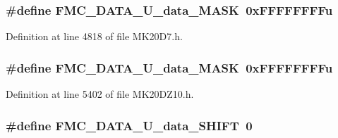 \subsubsection[{\texorpdfstring{F\+M\+C\+\_\+\+D\+A\+T\+A\+\_\+\+U\+\_\+data\+\_\+\+M\+A\+SK}{FMC_DATA_U_data_MASK}}]{\setlength{\rightskip}{0pt plus 5cm}\#define F\+M\+C\+\_\+\+D\+A\+T\+A\+\_\+\+U\+\_\+data\+\_\+\+M\+A\+SK~0x\+F\+F\+F\+F\+F\+F\+F\+Fu}\hypertarget{group___f_m_c___register___masks_gae43292c4f0149b2bc25d115b7f5a6ee9}{}\label{group___f_m_c___register___masks_gae43292c4f0149b2bc25d115b7f5a6ee9}


Definition at line 4818 of file M\+K20\+D7.\+h.

\subsubsection[{\texorpdfstring{F\+M\+C\+\_\+\+D\+A\+T\+A\+\_\+\+U\+\_\+data\+\_\+\+M\+A\+SK}{FMC_DATA_U_data_MASK}}]{\setlength{\rightskip}{0pt plus 5cm}\#define F\+M\+C\+\_\+\+D\+A\+T\+A\+\_\+\+U\+\_\+data\+\_\+\+M\+A\+SK~0x\+F\+F\+F\+F\+F\+F\+F\+Fu}\hypertarget{group___f_m_c___register___masks_gae43292c4f0149b2bc25d115b7f5a6ee9}{}\label{group___f_m_c___register___masks_gae43292c4f0149b2bc25d115b7f5a6ee9}


Definition at line 5402 of file M\+K20\+D\+Z10.\+h.

\subsubsection[{\texorpdfstring{F\+M\+C\+\_\+\+D\+A\+T\+A\+\_\+\+U\+\_\+data\+\_\+\+S\+H\+I\+FT}{FMC_DATA_U_data_SHIFT}}]{\setlength{\rightskip}{0pt plus 5cm}\#define F\+M\+C\+\_\+\+D\+A\+T\+A\+\_\+\+U\+\_\+data\+\_\+\+S\+H\+I\+FT~0}\hypertarget{group___f_m_c___register___masks_gaa7a3b8bfa7aac03f2eef0b5e58dfbb44}{}\label{group___f_m_c___register___masks_gaa7a3b8bfa7aac03f2eef0b5e58dfbb44}


